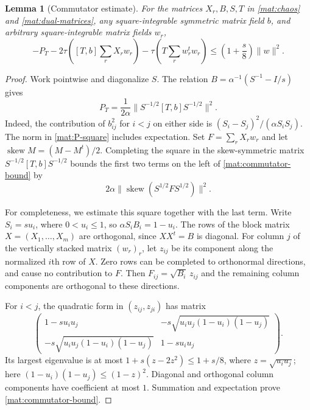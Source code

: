 \documentclass[11pt]{article}
\newcommand{\Id}{I}
\newtheorem{lemma}[theorem]{Lemma}
\theoremstyle{definition}
\theoremstyle{remark}
\numberwithin{equation}{section}
\begin{document}
\begin{lemma}[Commutator estimate]\label{mat:commutator}
For the matrices $X_r,B,S,T$ in \eqref{mat:chaos} and
\eqref{mat:dual-matrices}, any square-integrable symmetric matrix field $b$, and arbitrary
square-integrable matrix fields $w_r$,
\begin{equation}\label{mat:commutator-bound}
 -P_T-2\tau\left([T,b]\sum_rX_rw_r\right)
       -\tau\left(T\sum_rw_r^tw_r\right)
 \le\left(1+\frac s8\right)\|w\|^2.
\end{equation}
\end{lemma}

\begin{proof}
Work pointwise and diagonalize $S$.  The relation
$B=\alpha^{-1}(S^{-1}-\Id/s)$ gives
\begin{equation}\label{mat:P-square}
 P_T=\frac1{2\alpha}
       \bigl\|S^{-1/2}[T,b]S^{-1/2}\bigr\|^2.
\end{equation}
Indeed, the contribution of $b_{ij}^2$ for $i<j$ on either side is
$(S_i-S_j)^2/(\alpha S_iS_j)$.  The norm in
\eqref{mat:P-square} includes expectation.
Set $F=\sum_rX_rw_r$ and let $\operatorname{skew}M=(M-M^t)/2$.
Completing the square in the skew-symmetric matrix
$S^{-1/2}[T,b]S^{-1/2}$ bounds the first two terms on the left of
\eqref{mat:commutator-bound} by
\[
 2\alpha\bigl\|\operatorname{skew}(S^{1/2}FS^{1/2})\bigr\|^2.
\]

For completeness, we estimate this square together with the last term.
Write $S_i=su_i$, where $0<u_i\le1$, so
$\alpha S_iB_i=1-u_i$.  The rows of the block matrix
$X=(X_1,\ldots,X_m)$ are orthogonal, since $XX^t=B$ is diagonal.
For column $j$ of the vertically stacked matrix $(w_r)_r$, let $z_{ij}$
be its component along the normalized $i$th row of $X$.  Zero rows can
be completed to orthonormal directions, and cause no contribution to
$F$.  Then $F_{ij}=\sqrt{B_i}\,z_{ij}$ and the remaining column
components are orthogonal to these directions.

For $i<j$, the quadratic form in $(z_{ij},z_{ji})$ has matrix
\[
 \begin{pmatrix}
 1-su_iu_j&-s\sqrt{u_iu_j(1-u_i)(1-u_j)}\\
 -s\sqrt{u_iu_j(1-u_i)(1-u_j)}&1-su_iu_j
 \end{pmatrix}.
\]
Its largest eigenvalue is at most
$1+s(z-2z^2)\le1+s/8$, where $z=\sqrt{u_iu_j}$; here
$(1-u_i)(1-u_j)\le(1-z)^2$.
Diagonal and orthogonal column components have coefficient at most
$1$.  Summation and expectation prove \eqref{mat:commutator-bound}.
\end{proof}
\end{document}
